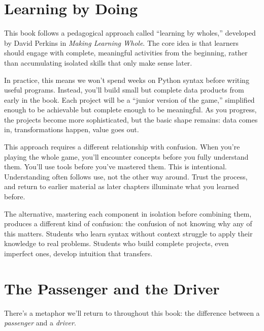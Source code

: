 \documentclass[
  letterpaper,
  DIV=11,
  numbers=noendperiod]{scrreprt}
\begin{document}
\section*{Learning by Doing}\label{learning-by-doing}


This book follows a pedagogical approach called ``learning by wholes,''
developed by David Perkins in \emph{Making Learning Whole}. The core
idea is that learners should engage with complete, meaningful activities
from the beginning, rather than accumulating isolated skills that only
make sense later.

In practice, this means we won't spend weeks on Python syntax before
writing useful programs. Instead, you'll build small but complete data
products from early in the book. Each project will be a ``junior version
of the game,'' simplified enough to be achievable but complete enough to
be meaningful. As you progress, the projects become more sophisticated,
but the basic shape remains: data comes in, transformations happen,
value goes out.

This approach requires a different relationship with confusion. When
you're playing the whole game, you'll encounter concepts before you
fully understand them. You'll use tools before you've mastered them.
This is intentional. Understanding often follows use, not the other way
around. Trust the process, and return to earlier material as later
chapters illuminate what you learned before.

The alternative, mastering each component in isolation before combining
them, produces a different kind of confusion: the confusion of not
knowing why any of this matters. Students who learn syntax without
context struggle to apply their knowledge to real problems. Students who
build complete projects, even imperfect ones, develop intuition that
transfers.

\section*{The Passenger and the
Driver}\label{the-passenger-and-the-driver}


There's a metaphor we'll return to throughout this book: the difference
between a \emph{passenger} and a \emph{driver}.
\end{document}
